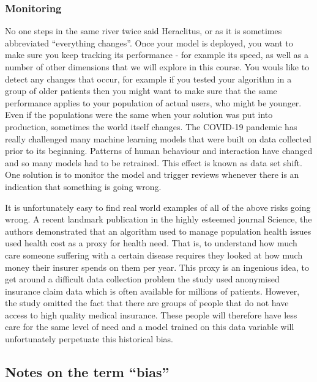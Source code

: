 \documentclass[
]{book}
\theoremstyle{definition}
\theoremstyle{definition}
\theoremstyle{definition}
\theoremstyle{definition}
\theoremstyle{remark}
\begin{document}
\hypertarget{monitoring}{%
\subsubsection{Monitoring}\label{monitoring}}

No one steps in the same river twice said Heraclitus, or as it is sometimes abbreviated ``everything changes''. Once your model is deployed, you want to make sure you keep tracking its performance - for example its speed, as well as a number of other dimensions that we will explore in this course. You wouls like to detect any changes that occur, for example if you tested your algorithm in a group of older patients then you might want to make sure that the same performance applies to your population of actual users, who might be younger. Even if the populations were the same when your solution was put into production, sometimes the world itself changes. The COVID-19 pandemic has really challenged many machine learning models that were built on data collected prior to its beginning. Patterns of human behaviour and interaction have changed and so many models had to be retrained. This effect is known as data set shift. One solution is to monitor the model and trigger reviews whenever there is an indication that something is going wrong.

It is unfortunately easy to find real world examples of all of the above risks going wrong. A recent landmark publication in the highly esteemed journal Science, the authors demonstrated that an algorithm used to manage population health issues used health cost as a proxy for health need. That is, to understand how much care someone suffering with a certain disease requires they looked at how much money their insurer spends on them per year. This proxy is an ingenious idea, to get around a difficult data collection problem the study used anonymised insurance claim data which is often available for millions of patients. However, the study omitted the fact that there are groups of people that do not have access to high quality medical insurance. These people will therefore have less care for the same level of need and a model trained on this data variable will unfortunately perpetuate this historical bias.

\hypertarget{notes-on-the-term-bias}{%
\subsection{Notes on the term ``bias''}\label{notes-on-the-term-bias}}
\end{document}
